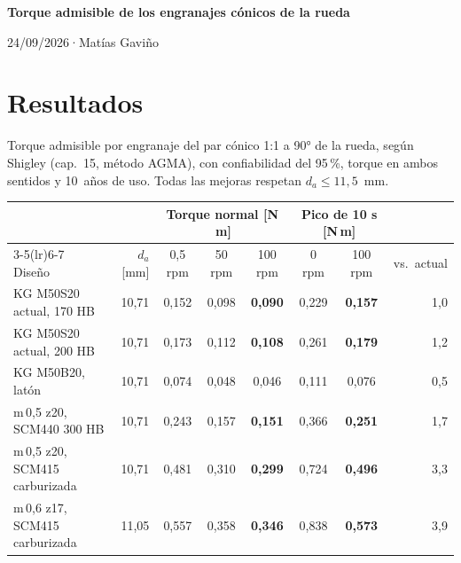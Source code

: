 \documentclass[11pt,a4paper]{article}
\newcommand{\titulo}{Torque admisible de los engranajes cónicos de la rueda}
\newcommand{\autor}{Matías Gaviño}
\newcommand{\fecha}{24/09/2026}                    %
\newcommand{\cabecera}{%
  \thispagestyle{fancy}%
  {\fontsize{20}{24}\selectfont\bfseries\titulo\par}%
  \vspace{5pt}%
  {\small\color{gris-medio}\fecha\quad·\quad\autor\par}%
  \vspace{6pt}}
\begin{document}
\cabecera

\section{Resultados}
Torque admisible por engranaje del par cónico 1:1 a 90° de la rueda, según Shigley
(cap.~15, método AGMA), con confiabilidad del 95\,\%, torque en ambos sentidos y 10~años de uso.
Todas las mejoras respetan $d_a\le11{,}5$~mm.

\begin{table}[H]\centering\small\setlength{\tabcolsep}{3.6pt}
\begin{tabular}{l r ccc cc r}
\toprule
 & & \multicolumn{3}{c}{Torque normal [N\,m]} & \multicolumn{2}{c}{Pico de 10 s [N\,m]} & \\
\cmidrule(lr){3-5}\cmidrule(lr){6-7}
Diseño & $d_a$ [mm] & 0,5 rpm & 50 rpm & 100 rpm & 0 rpm & 100 rpm & vs.\ actual\\
\midrule
KG M50S20 actual, 170 HB   & 10,71 & 0,152 & 0,098 & \textbf{0,090} & 0,229 & \textbf{0,157} & 1,0\\
KG M50S20 actual, 200 HB   & 10,71 & 0,173 & 0,112 & \textbf{0,108} & 0,261 & \textbf{0,179} & 1,2\\
KG M50B20, latón                  & 10,71 & 0,074 & 0,048 & 0,046 & 0,111 & 0,076 & 0,5\\
m\,0,5 z20, SCM440 300 HB         & 10,71 & 0,243 & 0,157 & \textbf{0,151} & 0,366 & \textbf{0,251} & 1,7\\
m\,0,5 z20, SCM415 carburizada    & 10,71 & 0,481 & 0,310 & \textbf{0,299} & 0,724 & \textbf{0,496} & 3,3\\
m\,0,6 z17, SCM415 carburizada    & 11,05 & 0,557 & 0,358 & \textbf{0,346} & 0,838 & \textbf{0,573} & 3,9\\
\bottomrule
\end{tabular}
\end{table}
\end{document}
